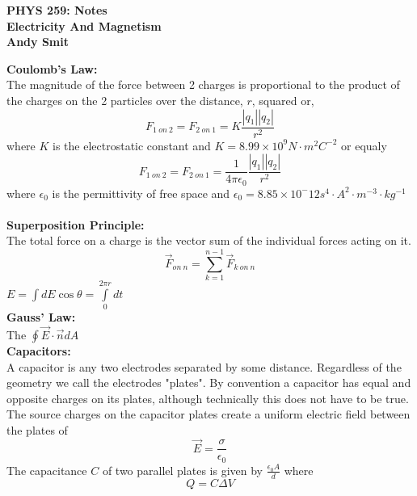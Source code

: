 \documentclass[14pt]{article}
\begin{document}
    \begin{center}
        \textbf{PHYS 259: Notes\\Electricity And Magnetism\\Andy Smit}
    \end{center}
    \textbf{Coulomb's Law:}\\
    The magnitude of the force between 2 charges is proportional to the product of the charges on the 2 particles over the distance, $r$, squared or,  $$F_{1\ on\ 2}=F_{2\ on\ 1}=K \frac{|q_1||q_2|}{r^2}$$where $K$ is the electrostatic constant and $K=8.99\times 10^9 N\cdot m^2 C^{-2}$ or equaly $$F_{1\ on\ 2}=F_{2\ on\ 1}=\frac{1}{4\pi\epsilon_0}\frac{|q_1||q_2|}{r^2}$$ where $\epsilon_0$ is the permittivity of free space and $\epsilon_0=8.85\times10^-12 s^4\cdot A^2\cdot m^{-3}\cdot kg^{-1}$\\\\
    \textbf{Superposition Principle:}\\
    The total force on a charge is the vector sum of the individual forces acting on it. $$\vec{F}_{on\ n}=\sum\limits_{k=1}^{n-1}\vec{F}_{k\ on\ n}$$
    $E=\int dE\cos\theta=\int\limits_0^{2\pi r}dt$\\
    \textbf{Gauss' Law:}\\
    The 
    $\oint\vec{E} \cdot\vec{n}dA$\\
    \textbf{Capacitors: }\\
    A capacitor is any two electrodes separated by some distance. Regardless of the geometry we call the electrodes "plates".
    By convention a capacitor has equal and opposite charges on its plates, although technically this does not have to be true.
    The source charges on the capacitor plates create a uniform electric field between the plates of 
    $$\vec E=\frac{\sigma}{\epsilon_0}$$
    The capacitance $C$ of two parallel plates is given by $\frac{\epsilon_0A}{d}$ where
    $$Q=C\Delta V$$
\end{document}
